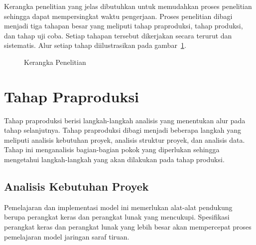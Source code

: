 Kerangka penelitian yang jelas dibutuhkan untuk memudahkan proses penelitian sehingga dapat
mempersingkat waktu pengerjaan. Proses penelitian dibagi menjadi tiga tahapan besar yang meliputi
tahap praproduksi, tahap produksi, dan tahap uji coba. Setiap tahapan tersebut dikerjakan secara
terurut dan sistematis. Alur setiap tahap diilustrasikan pada gambar~\ref{fig:kerangkapenelitian}.

\begin{figure}[htbp]
    \begin{center}
    \end{center}
    \vspace{-20pt}
    \captionsetup{labelfont=bf, textfont=bf}
    \caption{Kerangka Penelitian}
    \vspace{-10pt}
    \captionsetup{labelfont=md, textfont=md}
    \label{fig:kerangkapenelitian}
\end{figure}

\section{Tahap Praproduksi} \label{sec:3-TahapPraproduksi}

Tahap praproduksi berisi langkah-langkah analisis yang menentukan alur pada tahap selanjutnya. Tahap
praproduksi dibagi menjadi beberapa langkah yang meliputi analisis kebutuhan proyek, analisis
struktur proyek, dan analisis data. Tahap ini menganalisis bagian-bagian pokok yang diperlukan
sehingga mengetahui langkah-langkah yang akan dilakukan pada tahap produksi.

\subsection{Analisis Kebutuhan Proyek}

Pemelajaran dan implementasi model ini memerlukan alat-alat pendukung berupa perangkat keras dan
perangkat lunak yang mencukupi. Spesifikasi perangkat keras dan perangkat lunak yang lebih besar
akan mempercepat proses pemelajaran model jaringan saraf tiruan.

